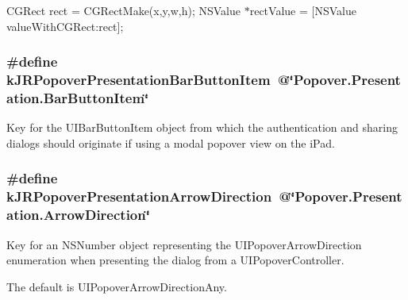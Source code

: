 CGRect rect = CGRectMake(x,y,w,h); NSValue $\ast$rectValue = \mbox{[}NSValue valueWithCGRect:rect\mbox{]}; \hypertarget{group__custom_interface_ga6b597e0a293938c07e5f36cd88da5a71}{
\subsubsection[{kJRPopoverPresentationBarButtonItem}]{\setlength{\rightskip}{0pt plus 5cm}\#define kJRPopoverPresentationBarButtonItem~@\char`\"{}Popover.Presentation.BarButtonItem\char`\"{}}}
\label{group__custom_interface_ga6b597e0a293938c07e5f36cd88da5a71}
Key for the {\ttfamily UIBarButtonItem} object from which the authentication and sharing dialogs should originate if using a modal popover view on the iPad. \hypertarget{group__custom_interface_gafe8ed9543a8bd4a8ef872f77bce583c5}{
\subsubsection[{kJRPopoverPresentationArrowDirection}]{\setlength{\rightskip}{0pt plus 5cm}\#define kJRPopoverPresentationArrowDirection~@\char`\"{}Popover.Presentation.ArrowDirection\char`\"{}}}
\label{group__custom_interface_gafe8ed9543a8bd4a8ef872f77bce583c5}
Key for an {\ttfamily NSNumber} object representing the UIPopoverArrowDirection enumeration when presenting the dialog from a {\ttfamily UIPopoverController}.

The default is UIPopoverArrowDirectionAny.

